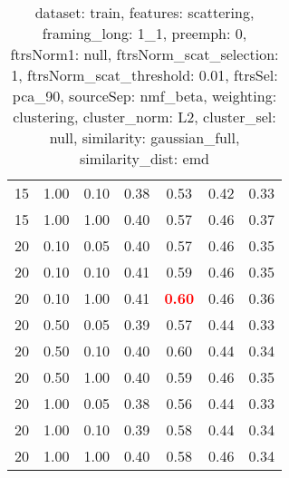 \begin{table}
\begin{center}
\begin{tabular}{lllcccc}
15 & 1.00 & 0.10 & 0.38 & 0.53 & 0.42 & 0.33 \\ 
15 & 1.00 & 1.00 & 0.40 & 0.57 & 0.46 & 0.37 \\ 
20 & 0.10 & 0.05 & 0.40 & 0.57 & 0.46 & 0.35 \\ 
20 & 0.10 & 0.10 & 0.41 & 0.59 & 0.46 & 0.35 \\ 
20 & 0.10 & 1.00 & 0.41 & \textbf{\textcolor{red}{0.60}} & 0.46 & 0.36 \\ 
20 & 0.50 & 0.05 & 0.39 & 0.57 & 0.44 & 0.33 \\ 
20 & 0.50 & 0.10 & 0.40 & 0.60 & 0.44 & 0.34 \\ 
20 & 0.50 & 1.00 & 0.40 & 0.59 & 0.46 & 0.35 \\ 
20 & 1.00 & 0.05 & 0.38 & 0.56 & 0.44 & 0.33 \\ 
20 & 1.00 & 0.10 & 0.39 & 0.58 & 0.44 & 0.34 \\ 
20 & 1.00 & 1.00 & 0.40 & 0.58 & 0.46 & 0.34 \\ 
\end{tabular} 
\end{center} 
\caption{dataset: train, features: scattering, framing\_long: 1\_1, preemph: 0, ftrsNorm1: null, ftrsNorm\_scat\_selection: 1, ftrsNorm\_scat\_threshold: 0.01, ftrsSel: pca\_90, sourceSep: nmf\_beta, weighting: clustering, cluster\_norm: L2, cluster\_sel: null, similarity: gaussian\_full, similarity\_dist: emd} 
\label{datasetrFeaturscFraminlong1_1Preemp0Ftrsnorm1nuFtrsnoscatselect1Ftrsnoscatthresh0.01Ftrsselpc90SourcesepnmbeWeightclClustenormL2ClusteselnuSimilagafuSimiladistem} 
\end{table} 
 
